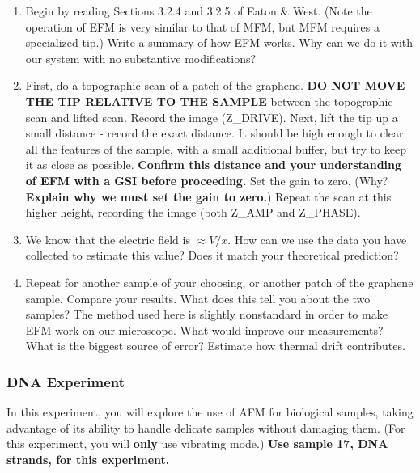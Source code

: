\documentclass{../lab}
\begin{document}
\begin{enumerate}
    \item Begin by reading Sections 3.2.4 and 3.2.5 of Eaton \& West. (Note the operation of EFM is very similar to that of MFM, but MFM requires a specialized tip.) Write a summary of how EFM works. Why can we do it with our system with no substantive modifications?

    \item First, do a topographic scan of a patch of the graphene. \textbf{DO NOT MOVE THE TIP RELATIVE TO THE SAMPLE} between the topographic scan and lifted scan. Record the image (Z\_DRIVE). Next, lift the tip up a small distance - record the exact distance. It should be high enough to clear all the features of the sample, with a small additional buffer, but try to keep it as close as possible. \textbf{Confirm this distance and your understanding of EFM with a GSI before proceeding.} Set the gain to zero. (Why? \textbf{Explain why we must set the gain to zero.}) Repeat the scan at this higher height, recording the image (both Z\_AMP and Z\_PHASE).  %

    \item We know that the electric field is $\approx V/x$. How can we use the data you have collected to estimate this value? Does it match your theoretical prediction?

    \item Repeat for another sample of your choosing, or another patch of the graphene sample. Compare your results. What does this tell you about the two samples? The method used here is slightly nonstandard in order to make EFM work on our microscope. What would improve our measurements? What is the biggest source of error? Estimate how thermal drift contributes.
\end{enumerate}

\subsubsection{DNA Experiment}

\label{subsec:DNA}

In this experiment, you will explore the use of AFM for biological samples, taking advantage of its ability to handle delicate samples without damaging them. (For this experiment, you will \textbf{only} use vibrating mode.) \textbf{Use sample 17, DNA strands, for this experiment.}
\end{document}
